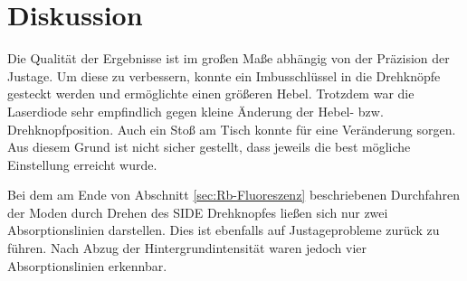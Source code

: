 \newpage
\section{Diskussion}
\label{sec:Diskussion}

Die Qualität der Ergebnisse ist im großen Maße abhängig von der Präzision
der Justage. Um diese zu verbessern, konnte ein Imbusschlüssel in die
Drehknöpfe gesteckt werden und ermöglichte einen größeren Hebel.
Trotzdem war die Laserdiode sehr empfindlich gegen kleine Änderung der
Hebel- bzw. Drehknopfposition.
Auch ein Stoß am Tisch konnte für eine Veränderung sorgen.
Aus diesem Grund ist nicht sicher gestellt, dass jeweils die best mögliche
Einstellung erreicht wurde.

Bei dem am Ende von Abschnitt \ref{sec:Rb-Fluoreszenz} beschriebenen Durchfahren
der Moden durch Drehen des SIDE Drehknopfes ließen sich nur zwei Absorptionslinien
darstellen. Dies ist ebenfalls auf Justageprobleme zurück zu führen.
Nach Abzug der Hintergrundintensität waren jedoch vier Absorptionslinien
erkennbar.
